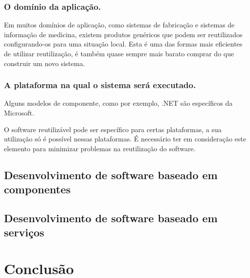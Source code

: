\documentclass[runningheads]{llncs}
\begin{document}
\subsubsection{O domínio da aplicação.}

Em muitos domínios de aplicação, como sistemas de fabricação e sistemas de informação de medicina, existem produtos genéricos que podem ser reutilizados configurando-os para uma situação local. Esta é uma das formas mais eficientes de utilizar reutilização, é também quase sempre mais barato comprar do que construir um novo sistema. 

\subsubsection{A plataforma na qual o sistema será executado.}

Alguns modelos de componente, como por exemplo, .NET são específicos da Microsoft. \par
O software reutilizável pode ser específico para certas plataformas, a sua utilização só é possível nessas plataformas. É necessário ter em consideração este elemento para minimizar problemas na reutilização do software.


\subsection{Desenvolvimento de software baseado em componentes}



\subsection{Desenvolvimento de software baseado em serviços}


\section{Conclusão}
\end{document}
